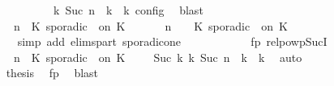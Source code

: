 \begin{isabellebody}
\ \ \ \ \ \ \ \ \ \ \ \ \ \ \ \ {\isasymand}\ {\isasymrho}\ {\isasymin}\ {\isasymlbrakk}\ {\isasymGamma}\isactrlsub k{\isacharcomma}\ Suc\ n\ {\isasymturnstile}\ {\isasymPsi}\isactrlsub k\ {\isasymtriangleright}\ {\isasymPhi}\isactrlsub k\ {\isasymrbrakk}\isactrlsub c\isactrlsub o\isactrlsub n\isactrlsub f\isactrlsub i\isactrlsub g{\isacartoucheclose}\ \isamarkupfalse%
\ blast\isanewline
\ \ \ \ \ \ \ \ \ \ \isamarkupfalse%
\isanewline
\ \ \ \ \ \ \ \ \ \ \ \ {\isacartoucheopen}{\isacharparenleft}{\isasymGamma}{\isacharcomma}\ n\ {\isasymturnstile}\ {\isacharparenleft}{\isacharparenleft}K\ sporadic\ {\isasymtau}\ on\ K\ {\isacharhash}\ {\isasymPsi}{\isacharparenright}\ {\isasymtriangleright}\ {\isasymPhi}{\isacharparenright}\ {\isasymhookrightarrow}\ {\isacharparenleft}{\isasymGamma}{\isacharcomma}\ n\ {\isasymturnstile}\ {\isasymPsi}\ {\isasymtriangleright}\ {\isacharparenleft}{\isacharparenleft}K\ sporadic\ {\isasymtau}\ on\ K\ {\isacharhash}\ {\isasymPhi}{\isacharparenright}{\isacharparenright}{\isacartoucheclose}\isanewline
\ \ \ \ \ \ \ \ \ \ \ \ \isamarkupfalse%
\ {\isacharparenleft}simp\ add{\isacharcolon}\ elims{\isacharunderscore}part\ sporadic{\isacharunderscore}on{\isacharunderscore}e{}{\isacharparenright}\isanewline
\ \ \ \ \ \ \ \ \ \ \isamarkupfalse%
\ fp\ relpowp{\isacharunderscore}Suc{\isacharunderscore}I{}\ \isamarkupfalse%
\isanewline
\ \ \ \ \ \ \ \ \ \ \ \ {\isacartoucheopen}{\isacharparenleft}{\isacharparenleft}{\isasymGamma}{\isacharcomma}\ n\ {\isasymturnstile}\ {\isacharparenleft}{\isacharparenleft}K\ sporadic\ {\isasymtau}\ on\ K\ {\isacharhash}\ {\isasymPsi}{\isacharparenright}\ {\isasymtriangleright}\ {\isasymPhi}{\isacharparenright}\ {\isasymhookrightarrow}\isactrlbsup Suc\ k\isactrlesup \ {\isacharparenleft}{\isasymGamma}\isactrlsub k{\isacharcomma}\ Suc\ n\ {\isasymturnstile}\ {\isasymPsi}\isactrlsub k\ {\isasymtriangleright}\ {\isasymPhi}\isactrlsub k{\isacharparenright}{\isacharparenright}{\isacartoucheclose}\ \isamarkupfalse%
\ auto\isanewline
\ \ \ \ \ \ \ \ \ \ \isamarkupfalse%
\ {\isacharquery}thesis\ \isamarkupfalse%
\ fp\ \isamarkupfalse%
\ blast\isanewline
\ \ \ \ \ \ \ \ \isamarkupfalse%
\isanewline
\ \ \ \ \ \ \ \ \isamarkupfalse%

\end{isabellebody}
